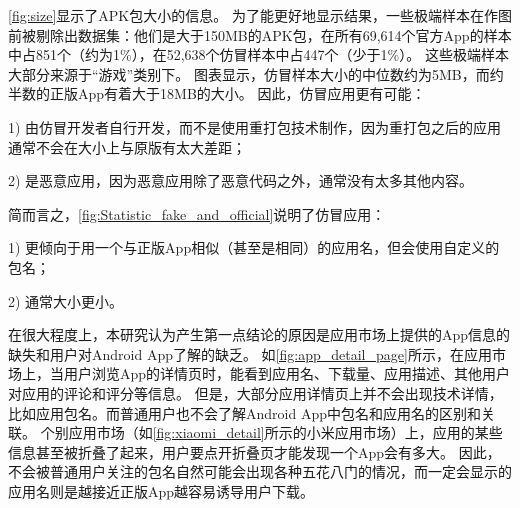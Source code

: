 \autoref{fig:size}显示了APK包大小的信息。
为了能更好地显示结果，一些极端样本在作图前被剔除出数据集：他们是大于150MB的APK包，在所有69,614个官方App的样本中占851个（约为1\%），在52,638个仿冒样本中占447个（少于1\%）。
这些极端样本大部分来源于``游戏''类别下。
图表显示，仿冒样本大小的中位数约为5MB，而约半数的正版App有着大于18MB的大小。
因此，仿冒应用更有可能：

1) 由仿冒开发者自行开发，而不是使用重打包技术制作，因为重打包之后的应用通常不会在大小上与原版有太大差距；

2) 是恶意应用，因为恶意应用除了恶意代码之外，通常没有太多其他内容。
\vspace{1mm}

简而言之，\autoref{fig:Statistic_fake_and_official}说明了仿冒应用：

1) 更倾向于用一个与正版App相似（甚至是相同）的应用名，但会使用自定义的包名；

2) 通常大小更小。
\vspace{1mm}

在很大程度上，本研究认为产生第一点结论的原因是应用市场上提供的App信息的缺失和用户对Android App了解的缺乏。
如\autoref{fig:app_detail_page}所示，在应用市场上，当用户浏览App的详情页时，能看到应用名、下载量、应用描述、其他用户对应用的评论和评分等信息。
但是，大部分应用详情页上并不会出现技术详情，比如应用包名。而普通用户也不会了解Android App中包名和应用名的区别和关联。
个别应用市场（如\autoref{fig:xiaomi_detail}所示的小米应用市场）上，应用的某些信息甚至被折叠了起来，用户要点开折叠页才能发现一个App会有多大。
因此，不会被普通用户关注的包名自然可能会出现各种五花八门的情况，而一定会显示的应用名则是越接近正版App越容易诱导用户下载。

